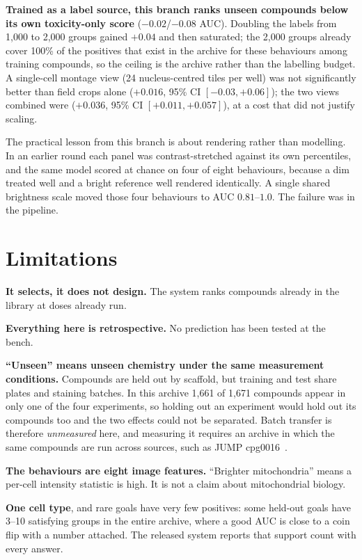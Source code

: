 \documentclass[11pt]{article}
\begin{document}
\textbf{Trained as a label source, this branch ranks unseen compounds below its own
toxicity-only score} ($-0.02$/$-0.08$ AUC). Doubling the labels from 1{,}000 to 2{,}000
groups gained $+0.04$ and then saturated; the 2{,}000 groups already cover 100\% of the
positives that exist in the archive for these behaviours among training compounds, so
the ceiling is the archive rather than the labelling budget. A single-cell montage view
(24 nucleus-centred tiles per well) was not significantly better than field crops alone
($+0.016$, 95\% CI $[-0.03,+0.06]$); the two views combined were ($+0.036$, 95\% CI
$[+0.011,+0.057]$), at a cost that did not justify scaling.

The practical lesson from this branch is about rendering rather than modelling. In an
earlier round each panel was contrast-stretched against its own percentiles, and the
same model scored at chance on four of eight behaviours, because a dim treated well and
a bright reference well rendered identically. A single shared brightness scale moved
those four behaviours to AUC $0.81$--$1.0$. The failure was in the pipeline.

\section{Limitations}

\textbf{It selects, it does not design.} The system ranks compounds already in the
library at doses already run.

\textbf{Everything here is retrospective.} No prediction has been tested at the bench.

\textbf{``Unseen'' means unseen chemistry under the same measurement conditions.}
Compounds are held out by scaffold, but training and test share plates and staining
batches. In this archive 1{,}661 of 1{,}671 compounds appear in only one of the four
experiments, so holding out an experiment would hold out its compounds too and the two
effects could not be separated. Batch transfer is therefore \emph{unmeasured} here, and
measuring it requires an archive in which the same compounds are run across sources,
such as JUMP cpg0016~\citep{chandrasekaran2023jump,weisbart2024gallery}.

\textbf{The behaviours are eight image features.} ``Brighter mitochondria'' means a
per-cell intensity statistic is high. It is not a claim about mitochondrial biology.

\textbf{One cell type}, and rare goals have very few positives: some held-out goals have
3--10 satisfying groups in the entire archive, where a good AUC is close to a coin flip
with a number attached. The released system reports that support count with every
answer.
\end{document}
